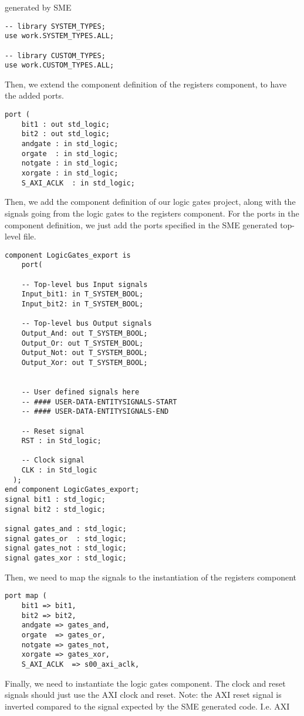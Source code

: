 generated by SME
\begin{lstlisting}
-- library SYSTEM_TYPES;
use work.SYSTEM_TYPES.ALL;

-- library CUSTOM_TYPES;
use work.CUSTOM_TYPES.ALL;
\end{lstlisting}
Then, we extend the component definition of the registers component, to have
the added ports.
\begin{lstlisting}
port (
    bit1 : out std_logic;
    bit2 : out std_logic;
    andgate : in std_logic;
    orgate  : in std_logic;
    notgate : in std_logic;
    xorgate : in std_logic;
    S_AXI_ACLK  : in std_logic;
\end{lstlisting}
Then, we add the component definition of our logic gates project, along with
the signals going from the logic gates to the registers component. For the
ports in the component definition, we just add the ports specified in the SME
generated top-level file.
\begin{lstlisting}
component LogicGates_export is
    port(

    -- Top-level bus Input signals
    Input_bit1: in T_SYSTEM_BOOL;
    Input_bit2: in T_SYSTEM_BOOL;

    -- Top-level bus Output signals
    Output_And: out T_SYSTEM_BOOL;
    Output_Or: out T_SYSTEM_BOOL;
    Output_Not: out T_SYSTEM_BOOL;
    Output_Xor: out T_SYSTEM_BOOL;


    -- User defined signals here
    -- #### USER-DATA-ENTITYSIGNALS-START
    -- #### USER-DATA-ENTITYSIGNALS-END

    -- Reset signal
    RST : in Std_logic;

    -- Clock signal
    CLK : in Std_logic
  );
end component LogicGates_export;
signal bit1 : std_logic;
signal bit2 : std_logic;

signal gates_and : std_logic;
signal gates_or  : std_logic;
signal gates_not : std_logic;
signal gates_xor : std_logic;
\end{lstlisting}
Then, we need to map the signals to the instantiation of the registers component
\begin{lstlisting}
port map (
    bit1 => bit1,
    bit2 => bit2,
    andgate => gates_and,
    orgate  => gates_or,
    notgate => gates_not,
    xorgate => gates_xor,
    S_AXI_ACLK  => s00_axi_aclk,
\end{lstlisting}
Finally, we need to instantiate the logic gates component. The clock and reset
signals should just use the AXI clock and reset. Note: the AXI reset signal is
inverted compared to the signal expected by the SME generated code. I.e. AXI
